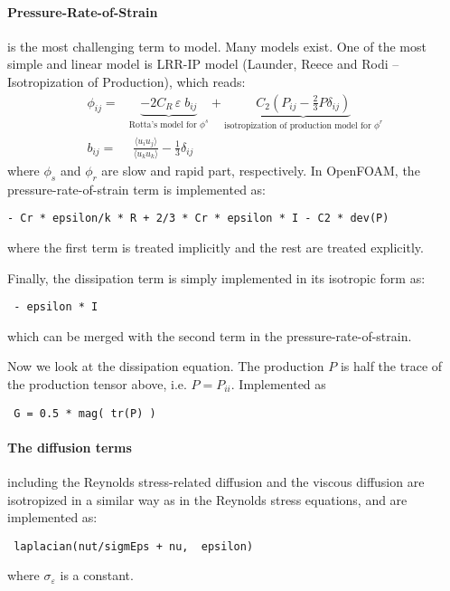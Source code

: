 \documentclass[11pt]{article}
\begin{document}
\paragraph{Pressure-Rate-of-Strain } is the most challenging term to model. Many models exist. One of the most simple and linear model is LRR-IP model (Launder, Reece and Rodi -- Isotropization of Production), which reads:
\begin{align}
\phi_{ij} =& \underbrace{- 2C_{R} \, \varepsilon \;  b_{ij}}_{\textrm{Rotta's model for } \phi^{s}} +  \underbrace{C_{2} (P_{ij} - \frac{2}{3}P\delta_{ij}) }_{\textrm{isotropization of production model for } \phi^{r} }\\
b_{ij} =& \; \frac{\langle u_{i} u_{j} \rangle}{\langle u_{k} u_{k} \rangle} - \frac{1}{3} \delta_{ij}
\end{align}
where $\phi_{s}$ and $\phi_{r}$ are slow and rapid part, respectively.
In OpenFOAM, the pressure-rate-of-strain term is implemented as:
\begin{center}
\verb#- Cr * epsilon/k * R + 2/3 * Cr * epsilon * I - C2 * dev(P)#
\end{center}
where the first term is treated implicitly and the rest are treated explicitly.

Finally, the dissipation term is simply implemented in its isotropic form as:
\begin{center}
\verb# - epsilon * I #
\end{center}
which can be merged with the second term in the pressure-rate-of-strain.

Now we look at the dissipation equation.  The production $P$ is half the trace of the production tensor above, i.e.  $P = P_{ii}$.  Implemented as
\begin{center}
\verb# G = 0.5 * mag( tr(P) )#
\end{center}

\paragraph{The diffusion terms} including the Reynolds stress-related diffusion and the viscous diffusion are isotropized in a similar way as in the Reynolds stress equations, and are implemented as:
\begin{center}
\verb# laplacian(nut/sigmEps + nu,  epsilon)#
\end{center}
where $\sigma_{\varepsilon}$ is a constant.
\end{document}
